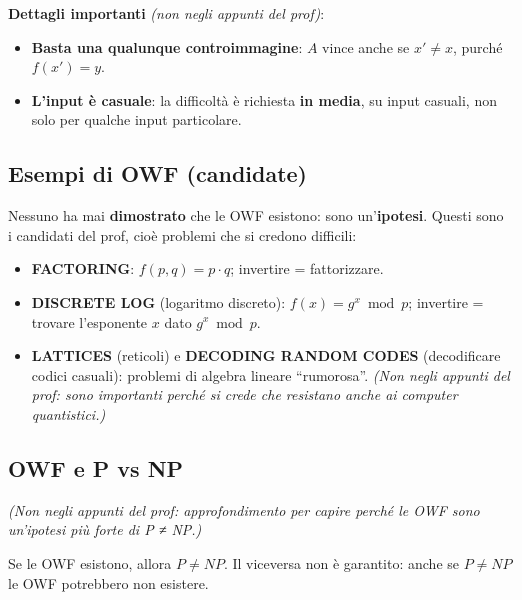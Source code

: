 \textbf{Dettagli importanti} \emph{(non negli appunti del prof)}:

\begin{itemize}
\tightlist
\item
  \textbf{Basta una qualunque controimmagine}: \(A\) vince anche se \(x' \neq x\), purché \(f(x') = y\).
\item
  \textbf{L'input è casuale}: la difficoltà è richiesta \textbf{in media}, su input casuali, non solo per qualche input particolare.
\end{itemize}

\subsection{Esempi di OWF (candidate)}

Nessuno ha mai \textbf{dimostrato} che le OWF esistono: sono un'\textbf{ipotesi}. Questi sono i candidati del prof, cioè problemi che si credono difficili:

\begin{itemize}
\tightlist
\item
  \textbf{FACTORING}: \(f(p, q) = p \cdot q\); invertire = fattorizzare.
\item
  \textbf{DISCRETE LOG} (logaritmo discreto): \(f(x) = g^x \bmod p\); invertire = trovare l'esponente \(x\) dato \(g^x \bmod p\).
\item
  \textbf{LATTICES} (reticoli) e \textbf{DECODING RANDOM CODES} (decodificare codici casuali): problemi di algebra lineare ``rumorosa''. \emph{(Non negli appunti del prof: sono importanti perché si crede che resistano anche ai computer quantistici.)}
\end{itemize}

\subsection{OWF e P vs NP}

\emph{(Non negli appunti del prof: approfondimento per capire perché le OWF sono un'ipotesi più forte di P ≠ NP.)}

\begin{inbreve}

Se le OWF esistono, allora \(P \neq NP\). Il viceversa non è garantito: anche se \(P \neq NP\) le OWF potrebbero non esistere.

\end{inbreve}

